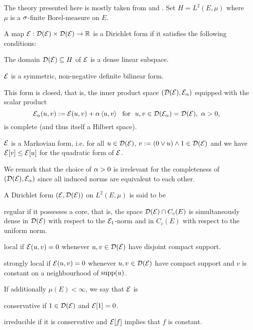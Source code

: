 The theory presented here is mostly taken from \cite{fukushima2011dirichlet} and \cite[ch. 4]{ma2012introduction}. Set $H=L^2(E,\mu)$ where $\mu$ is a $\sigma$-finite Borel-measure on $E$. 
\begin{defin}\label{defin:DF}
  A map $\mathcal{E}:\mathcal{D}(\mathcal{E})\times\mathcal{D}(\mathcal{E})\to\mathbb{R}$ is a Dirichlet form if it satisfies the following conditions:
  \begin{compactenum}[i.]
  \item The domain $\mathcal{D}(\mathcal{E})\subseteq H$ of $\mathcal{E}$ is a dense linear subspace.
  \item $\mathcal{E}$ is a symmetric, non-negative definite bilinear form.
  \item This form is closed, that is, the inner product space $(\mathcal{D}(\mathcal{E}),\mathcal{E}_\alpha)$ equipped with the scalar product
  \[
    \cE_\ga(u,v):=\cE(u,v)+\ga\left<u,v\right>\ \text{ for }\ u,v\in\cD(\cE_\ga)=\cD(\cE),\ \ga>0,
  \]
  is complete (and thus itself a Hilbert space).
  \item $\mathcal{E}$ is a Markovian form, i.e. for all $u\in\mathcal{D}(\mathcal{E})$, $v:=(0\vee u)\wedge 1\in\mathcal{D}(\mathcal{E})$ and we have $\mathcal{E}[v]\leq\mathcal{E}[u]$ for the quadratic form of $\mathcal{E}$. 
  \end{compactenum}
\end{defin}
We remark that the choice of $\alpha>0$ is irrelevant for the completeness of $(\mathcal{D}(\mathcal{E}),\mathcal{E}_\alpha)$ since all induced norms are equivalent to each other. 
\begin{defin}
  A Dirichlet form $(\mathcal{E},\mathcal{D}(\mathcal{E}))$ on $L^2(E,\mu)$ is said to be
  \begin{compactenum}[i.]
    \item regular if it possesses a core, that is, the space $\mathcal{D}(\mathcal{E})\cap C_c(E)$ is simultaneously dense in $\mathcal{D}(\mathcal{E})$ with respect to the $\mathcal{E}_1$-norm and in $C_c(E)$ with respect to the uniform norm. 
    \item local if $\mathcal{E}(u,v)=0$ whenever $u,v\in\mathcal{D}(\mathcal{E})$ have disjoint compact support.
    \item strongly local if $\mathcal{E}(u,v)=0$ whenever $u,v\in\mathcal{D}(\mathcal{E})$ have compact support and $v$ is constant on a neighbourhood of $\operatorname{supp}(u)$.
  \end{compactenum}
  If additionally $\mu(E)<\infty$, we say that $\mathcal{E}$ is
  \begin{compactenum}[i.]
    \setcounter{enumi}{3}
    \item conservative if $1\in\mathcal{D}(\mathcal{E})$ and $\mathcal{E}[1]=0$.
    \item irreducible if it is conservative and $\mathcal{E}[f]$ implies that $f$ is constant. 
  \end{compactenum}
\end{defin}
